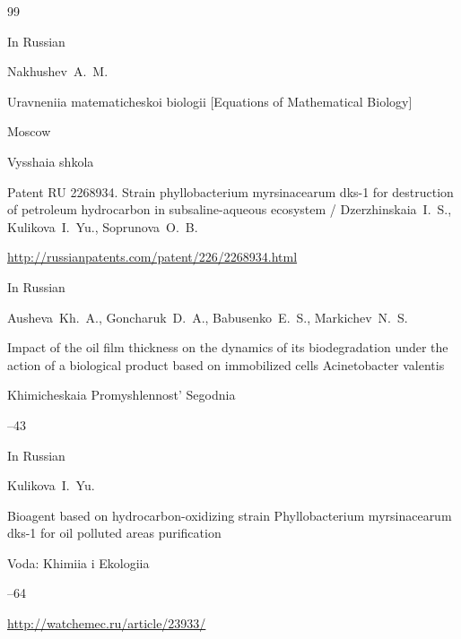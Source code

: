 \begin{thebibliography}{99}

\lang In Russian

\by Nakhushev~A.~M.

\book  Uravneniia matematicheskoi biologii \rm [Equations of Mathematical Biology]

\publaddr Moscow

\publ Vysshaia shkola






\thesis \rm Patent RU 2268934. Strain phyllobacterium myrsinacearum dks-1 for destruction of petro\-leum hydrocarbon in subsaline-aqueous ecosystem / Dzerzhinskaia~I.~S., Kuli\-kova~I.~Yu., Soprunova~O.~B.

\thesisinfo \url{http://russianpatents.com/patent/226/2268934.html}




\lang In Russian

\by Ausheva~Kh.~A., Goncharuk~D.~A., Babusenko~E.~S., Markichev~N.~S.

\paper Impact of the oil film thickness on the dynamics of its biodegradation under the action of a biological product based on immobilized cells Acinetobacter valentis

\jour  Khimicheskaia Promyshlennost' Segodnia



--43






\lang In Russian

\by Kulikova~I.~Yu.

\paper Bioagent based on hydrocarbon-oxidizing strain Phyllobacterium myrsinacearum dks-1 for oil polluted areas purification

\jour Voda: Khimiia i Ekologiia



--64

\url{http://watchemec.ru/article/23933/}







\end{thebibliography}
